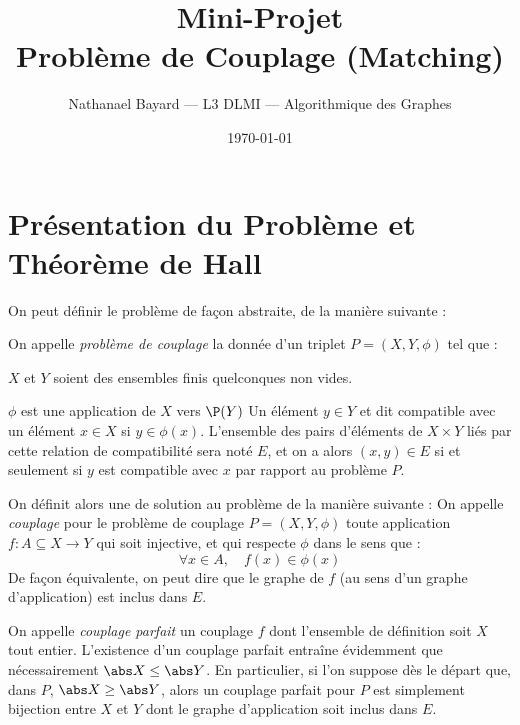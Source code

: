 








\author{Nathanael Bayard --- L3 DLMI --- Algorithmique des Graphes}
\title{Mini-Projet \\ Problème de Couplage (Matching)}
\date{\today}
    
 \maketitle
\section{Présentation du Problème et Théorème de Hall}
On peut définir le problème de façon abstraite, de la manière suivante :

\SEP\jdefi On appelle \emph{problème de couplage} la donnée d'un triplet $P = (X,Y,\phi)$ tel que :
\mathL
\item $X$ et $Y$ soient des ensembles finis quelconques non vides.
\item $\phi$ est une application de $X$ vers $\P(Y)$
\endL
Un élément $y \in Y$ et dit compatible avec un élément $x \in X$ si $y \in \phi(x)$. L'ensemble des pairs d'éléments de $X \times Y$ liés par cette relation de compatibilité sera noté $E$, et on a alors $(x,y) \in E$ si et seulement si $y$ est compatible avec $x$ par rapport au problème $P$.
\SEP

On définit alors une de solution au problème de la manière suivante :
\SEP\jdefi On appelle \emph{couplage} pour le problème de couplage $P = (X,Y,\phi)$ toute application $f : A \subseteq X \to Y$ qui soit injective, et qui respecte $\phi$ dans le sens que :
\[ \forall x \in A, \quad f(x) \in \phi(x) \]
De façon équivalente, on peut dire que le graphe de $f$ (au sens d'un graphe d'application) est inclus dans $E$.

On appelle \emph{couplage parfait} un couplage $f$ dont l'ensemble de définition soit $X$ tout entier. L'existence d'un couplage parfait entraîne évidemment que nécessairement $\abs X \leq \abs Y$. En particulier, si l'on suppose dès le départ que, dans $P$,  $\abs X \geq \abs Y$, alors un couplage parfait pour $P$ est simplement bijection entre $X$ et $Y$ dont le graphe d'application soit inclus dans $E$.

